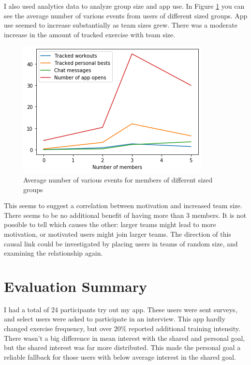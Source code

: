 \documentclass{l4proj}
\begin{document}
I also used analytics data to analyze group size and app use. In Figure \ref{fig:exercises} you can see the average number of various events from users of different sized groups. App use seemed to increase substantially as team sizes grew. There was a moderate increase in the amount of tracked exercise with team size.
\begin{figure}[H]
    \centering
    \includegraphics[width=1.0\linewidth]{data/activity.png}    
    \caption{Average number of various events for members of different sized groups}
    \label{fig:exercises} 
\end{figure}

This seems to suggest a correlation between motivation and increased team size. There seems to be no additional benefit of having more than 3 members. It is not possible to tell which causes the other: larger teams might lead to more motivation, or motivated users might join larger teams. The direction of this causal link could be investigated by placing users in teams of random size, and examining the relationship again.


\section{Evaluation Summary}
I had a total of 24 participants try out my app. These users were sent surveys, and select users were asked to participate in an interview. This app hardly changed exercise frequency, but over 20\% reported additional training intensity. There wasn't a big difference in mean interest with the shared and personal goal, but the shared interest was far more distributed. This made the personal goal a reliable fallback for those users with below average interest in the shared goal. 
\end{document}
